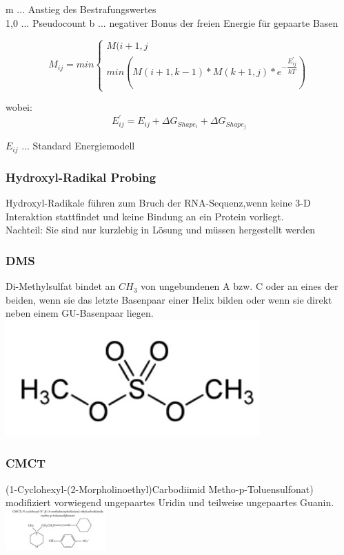 m ... Anstieg des Bestrafungswertes \\
1,0 ... Pseudocount
b ... negativer Bonus der freien Energie für gepaarte Basen

\begin{equation}
M_{ij} = min
\begin{cases} 
M(i+1,j \\
min (M(i+1,k-1)*M(k+1,j)*e^{-\dfrac{E^{'}_{ij}}{kT}})
\end{cases}
\end{equation}

wobei:
\begin{equation}
E^{'}_{ij} = E_{ij} + \Delta G_{Shape_i} + \Delta G_{Shape_j}
\end{equation}

$E_{ij}$ ... Standard Energiemodell

\subsubsection{Hydroxyl-Radikal Probing}
Hydroxyl-Radikale führen zum Bruch der RNA-Sequenz,wenn keine 3-D Interaktion stattfindet und keine Bindung an ein Protein vorliegt.\\
Nachteil: Sie sind nur kurzlebig in Lösung und müssen hergestellt werden

\subsubsection{DMS}
Di-Methylsulfat bindet an $CH_3$ von ungebundenen A bzw. C oder an eines der beiden, wenn sie das letzte Basenpaar einer Helix bilden oder wenn sie direkt neben einem GU-Basenpaar liegen. \\
\includegraphics[scale=0.3]{lectures/160513/pix/Dimethylsulfat.jpg} \\

\subsubsection{CMCT}
(1-Cyclohexyl-(2-Morpholinoethyl)Carbodiimid Metho-p-Toluensulfonat) modifiziert vorwiegend ungepaartes Uridin und teilweise ungepaartes Guanin. \\
\includegraphics[scale=1]{lectures/160513/pix/CMCT.jpg} \\

